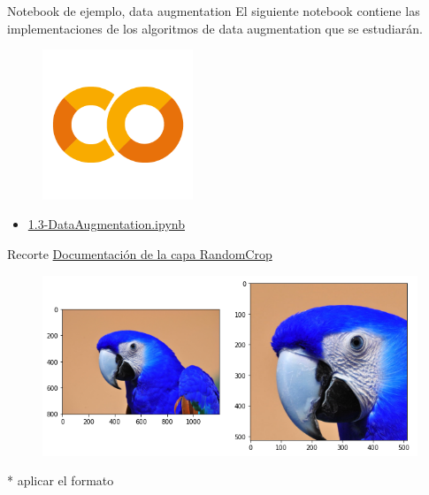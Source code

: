 \begin{frame}{Notebook de ejemplo, data augmentation}
El siguiente notebook contiene las implementaciones de los algoritmos de data augmentation que se estudiarán.

\begin{figure}
    \centering
    \includegraphics[width=0.4\textwidth]{Slides/figures/GoogleColab.png}
\end{figure}
\begin{itemize}
    \centering
    \item {\Large \href{https://colab.research.google.com/drive/12G2Ijal10Fa0U_3obrwKkmuSccqIGUNq?usp=sharing}{1.3-DataAugmentation.ipynb}}
\end{itemize}
\end{frame}

\begin{frame}{Recorte}
\label{section:Recorte}
\textcolor{blue}{\href{https://keras.io/api/layers/preprocessing_layers/image_augmentation/random_crop/}{Documentación de la capa RandomCrop}}
\begin{figure}
    \centering
    \includegraphics[width=\textwidth]{Slides/figures/Tema 3/Crop.png}
\end{figure}

* aplicar el formato 
\end{frame}

